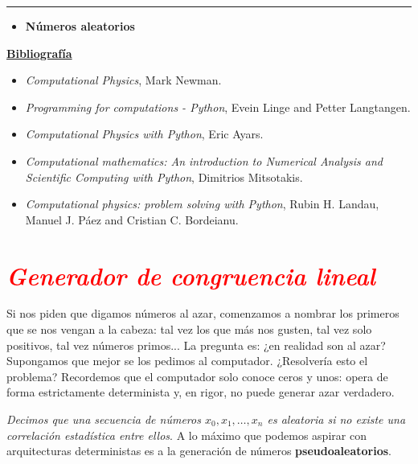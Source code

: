\documentclass[12pt]{article}
\begin{document}
		\thispagestyle{firstpage}
		\vspace*{1.5cm}
	
	\begin{center}
		\rule{\textwidth}{0.4pt}
	\end{center}
	
	\begin{itemize}[leftmargin=*,label=\textcolor{red}{\ensuremath{\blacktriangleright}}]
		\item \textbf{Números aleatorios}
	\end{itemize}
	
	\noindent
	\textbf{\underline{Bibliografía}}
	\begin{itemize}[leftmargin=*, label={\textcolor{blue}{$\bullet$}}]
		\item \textit{Computational Physics}, Mark Newman.
        \item \textit{Programming for computations - Python}, Evein Linge and Petter Langtangen. 
        \item \textit{Computational Physics with Python}, Eric Ayars. 
        \item \textit{Computational mathematics: An introduction to 
        Numerical Analysis and Scientific Computing  with Python}, Dimitrios Mitsotakis. 
        \item \textit{Computational physics: problem solving with Python}, 
        Rubin H. Landau, Manuel J. Páez and Cristian C. Bordeianu.
    \end{itemize}
     
    

\section*{\textcolor{red}{\textit{Generador de congruencia lineal}}}

Si nos piden que digamos números al azar, comenzamos a nombrar los primeros que se nos vengan a la cabeza: 
tal vez los que más nos gusten, tal vez solo positivos, tal vez números primos... La pregunta es: 
¿en realidad son al azar? Supongamos que mejor se los pedimos al computador. ¿Resolvería esto el problema? 
Recordemos que el computador solo conoce ceros y unos: opera de forma estrictamente determinista y, en rigor, 
no puede generar azar verdadero. 

\textit{Decimos que una secuencia de números $x_0, x_1, \dots, x_n$ es aleatoria si no existe una correlación estadística entre ellos}. 
A lo máximo que podemos aspirar con arquitecturas deterministas es a la generación de números \textbf{pseudoaleatorios}. 
\end{document}

